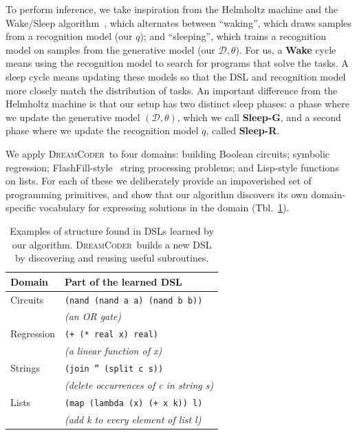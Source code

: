 \documentclass{article}
\newcommand{\system}{\textsc{DreamCoder}~}
\newcommand{\code}[1]{{\footnotesize\texttt{#1}}}
\begin{document}
To perform inference, we take inspiration from the Helmholtz machine and the Wake/Sleep algorithm~\cite{hinton1995wake},
which alternates between ``waking'', which draws samples from a recognition model (our $q$);
and  ``sleeping'', which trains a recognition model on samples from the generative model (our $\mathcal{D},\theta$).
For us, a \textbf{Wake} cycle means using the recognition model to search for programs that solve the tasks.
A sleep cycle means  updating these models so that the DSL and  recognition model
more closely match the distribution of tasks.
An important difference from the Helmholtz machine
is that our setup has two distinct sleep phases: a phase where we update the generative model
$(\mathcal{D},\theta)$, which we call \textbf{Sleep-G},
and a second phase where we update the recognition model $q$,
 called \textbf{Sleep-R}.



We apply \system to four domains:
 building Boolean circuits; symbolic regression; FlashFill-style~\cite{gulwani2011automating} string processing problems; and Lisp-style functions on lists.
 For each of these we deliberately provide an impoverished
 set of programming primitives,
 and show that our algorithm discovers
 its own domain-specific vocabulary for expressing solutions in the domain (Tbl.~\ref{initialExampleDSL}).
 \begin{table}[b]
    \begin{tabular}{ll}
   \toprule
   Domain&Part of the learned DSL\\\midrule
   Circuits&\code{(nand (nand a a) (nand b b))}\\
   &\hspace{0.5cm} \emph{(an OR gate)}\\
   Regression& \code{(+ (* real x) real)} \\
      &\hspace{0.5cm} \emph{(a linear function of x)}\\
   Strings& \code{(join '' (split c s))}\\
   &\hspace{0.5cm} \emph{(delete occurrences of c in string s)}\\
   Lists& \code{(map (lambda (x) (+ x k)) l)}\\
   &\hspace{0.5cm} \emph{(add k to every element of list l)}
   \\\bottomrule
    \end{tabular}
    \caption{ Examples of structure found in DSLs  learned by our algorithm. \system builds a new DSL by discovering and reusing useful subroutines.}\label{initialExampleDSL}
 \end{table}
\end{document}
